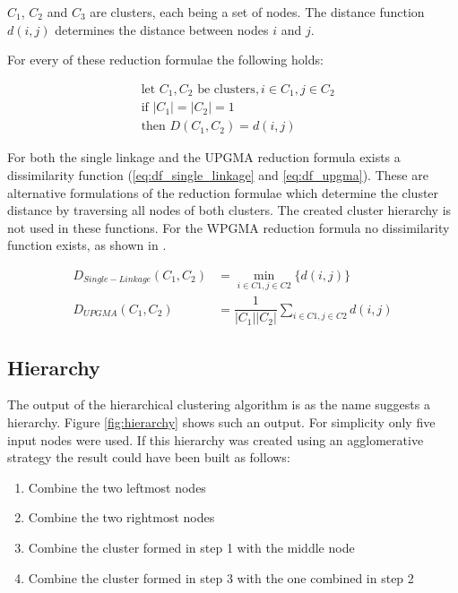 $C_1$, $C_2$ and $C_3$ are clusters, each being a set of nodes. The distance function $d(i, j)$ determines the distance between nodes $i$ and $j$.

For every of these reduction formulae the following holds:

\begin{equation}
\begin{split}
&\textrm{let }C_1, C_2\textrm{ be clusters}, i \in C_1, j \in C_2 \\
&\textrm{if }|C_1| = |C_2| = 1 \\
&\textrm{then }D(C_1, C_2) = d(i, j)
\end{split}
\end{equation}

For both the single linkage and the \acrshort{UPGMA} reduction formula exists a dissimilarity function (\ref{eq:df_single_linkage} and \ref{eq:df_upgma}). These are alternative formulations of the reduction formulae which determine the cluster distance by traversing all nodes of both clusters. The created cluster hierarchy is not used in these functions. For the \acrshort{WPGMA} reduction formula no dissimilarity function exists, as shown in \cite{clustering:2007}.

\begin{align}
\label{eq:df_single_linkage}
D_{Single-Linkage}(C_1, C_2) &= \min_{i\in{C1}, j\in{C2}}\{d(i, j)\} \\
\label{eq:df_upgma}
D_{UPGMA}(C_1, C_2) &= \dfrac{1}{|C_1||C_2|} \sum_{i\in{C1}, j\in{C2}}{d(i, j)}
\end{align}

\subsection{Hierarchy}
The output of the hierarchical clustering algorithm is as the name suggests a hierarchy. Figure \ref{fig:hierarchy} shows such an output. For simplicity only five input nodes were used. If this hierarchy was created using an agglomerative strategy the result could have been built as follows:

\begin{enumerate}
    \item Combine the two leftmost nodes
    \item Combine the two rightmost nodes
    \item Combine the cluster formed in step 1 with the middle node
    \item Combine the cluster formed in step 3 with the one combined in step 2
\end{enumerate}

